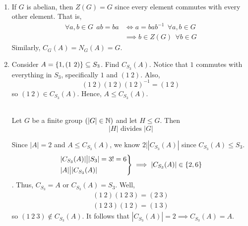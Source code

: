 \begin{fact} \leavevmode \\
    \begin{enumerate}
        \item If $G$ is abelian, then $Z(G) = G$ since every element commutes with every other element. That is,
        \begin{align*}
        \forall a,b \in G ~~ab = ba &\iff a = bab^{-1} ~~ \forall a,b \in G \\ &\implies b \in Z(G) ~~\forall b \in G
        \end{align*}
        Similarly, $C_G(A) = N_G(A) = G.$
        \item Consider $A=\left\{1, (1 ~2)\right\} \subseteq S_3$. Find $C_{S_3}(A)$. Notice that $1$ commutes with everything in $S_3$, specifically $1$ and $(1~2)$. Also,
        $$(1~2)(1~2)(1~2)^{-1} = (1~2)$$
        so $(1~2)\in C_{S_3}(A)$. Hence, $A \leq C_{S_3}(A)$.
        \begin{theorem} \leavevmode \\
            Let $G$ be a finite group $\left(|G| \in \mathbb{N}\right)$ and let $H \leq G$. Then
            $$|H| \text{ divides } |G|$$
        \end{theorem}
        Since $|A| = 2$ and $A \leq C_{S_3}(A)$, we know $2 \big| |C_{S_3}(A)|$ since $C_{S_3}(A) \leq S_3$.
        $$
        \begin{rcases*}
            |C_{S_3}(A)| \big| |S_3| = 3! = 6 \\
            |A| \big| |C_{S_3}(A)|
        \end{rcases*} \implies |C_{S_3}(A)| \in \set{2, 6}$$.
        Thus, $C_{S_3}= A$ or $C_{S_3}(A) = S_3$. Well,
        \begin{align*}
            (1~2)(1~2~3) = (2~3) \\
            (1~2~3)(1~2) = (1~3)
        \end{align*}
        so $(1~2~3) \not \in C_{S_3}(A)$. It follows that $|C_{S_3}(A)| = 2 \implies C_{S_3}(A) = A.$
    \end{enumerate}
\end{fact}
